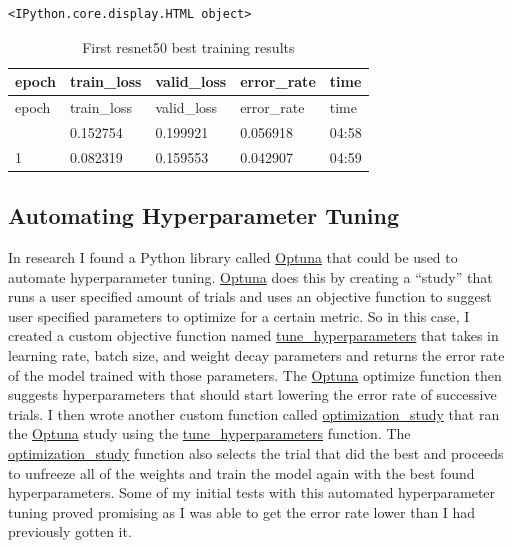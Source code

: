 \documentclass[
  letterpaper,
  DIV=11,
  numbers=noendperiod]{scrartcl}
\begin{document}
\begin{verbatim}
<IPython.core.display.HTML object>
\end{verbatim}

\hypertarget{tbl-firstresnet50results}{}
\begin{longtable}[]{@{}lllll@{}}
\caption{\label{tbl-firstresnet50results}First resnet50 best training
results}\tabularnewline
\toprule\noalign{}
epoch & train\_loss & valid\_loss & error\_rate & time \\
\midrule\noalign{}
\endfirsthead
\toprule\noalign{}
epoch & train\_loss & valid\_loss & error\_rate & time \\
\midrule\noalign{}
\endhead
\bottomrule\noalign{}
\endlastfoot
0 & 0.152754 & 0.199921 & 0.056918 & 04:58 \\
1 & 0.082319 & 0.159553 & 0.042907 & 04:59 \\
\end{longtable}

\hypertarget{automating-hyperparameter-tuning}{%
\subsection{Automating Hyperparameter
Tuning}\label{automating-hyperparameter-tuning}}

In research I found a Python library called
\protect\hyperlink{optimization-library}{Optuna} that could be used to
automate hyperparameter tuning.
\protect\hyperlink{optimization-library}{Optuna} does this by creating a
``study'' that runs a user specified amount of trials and uses an
objective function to suggest user specified parameters to optimize for
a certain metric. So in this case, I created a custom objective function
named \protect\hyperlink{custom-tunehyperpar}{tune\_hyperparameters}
that takes in learning rate, batch size, and weight decay parameters and
returns the error rate of the model trained with those parameters. The
\protect\hyperlink{optimization-library}{Optuna} optimize function then
suggests hyperparameters that should start lowering the error rate of
successive trials. I then wrote another custom function called
\protect\hyperlink{custom-optstudy}{optimization\_study} that ran the
\protect\hyperlink{optimization-library}{Optuna} study using the
\protect\hyperlink{custom-tunehyperpar}{tune\_hyperparameters} function.
The \protect\hyperlink{custom-optstudy}{optimization\_study} function
also selects the trial that did the best and proceeds to unfreeze all of
the weights and train the model again with the best found
hyperparameters. Some of my initial tests with this automated
hyperparameter tuning proved promising as I was able to get the error
rate lower than I had previously gotten it.
\end{document}
